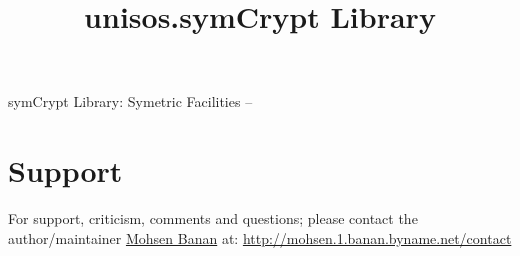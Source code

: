\documentclass{article}
\begin{document}

\begin{comment}
*  [[elisp:(org-cycle)][| ]]  *DBLK: front-begin*                                       :: [[elisp:(beginning-of-buffer)][Top]] [[elisp:(delete-other-windows)][(1)]]  [[elisp:(org-cycle)][| ]]
\end{comment}


\begin{comment}
*  [[elisp:(org-cycle)][| ]]  *DBLK: copyright*                                       :: [[elisp:(beginning-of-buffer)][Top]] [[elisp:(delete-other-windows)][(1)]]  [[elisp:(org-cycle)][| ]]
\end{comment}


\begin{comment}
*  [[elisp:(org-cycle)][| ]]  *DBLK: front-end*                                       :: [[elisp:(beginning-of-buffer)][Top]] [[elisp:(delete-other-windows)][(1)]]  [[elisp:(org-cycle)][| ]]
\end{comment}


\begin{comment}
*  [[elisp:(org-cycle)][| ]]  *DBLK: main-begin*                                       :: [[elisp:(beginning-of-buffer)][Top]] [[elisp:(delete-other-windows)][(1)]]  [[elisp:(org-cycle)][| ]]
\end{comment}

\title{unisos.symCrypt Library}


\thispagestyle{empty}


\bigskip

symCrypt Library: Symetric Facilities -- 

\section{Support}

For support, criticism, comments and questions; please contact the 
author/maintainer \href{http://mohsen.1.banan.byname.net}{Mohsen Banan} at: \url{http://mohsen.1.banan.byname.net/contact}
\end{document}
